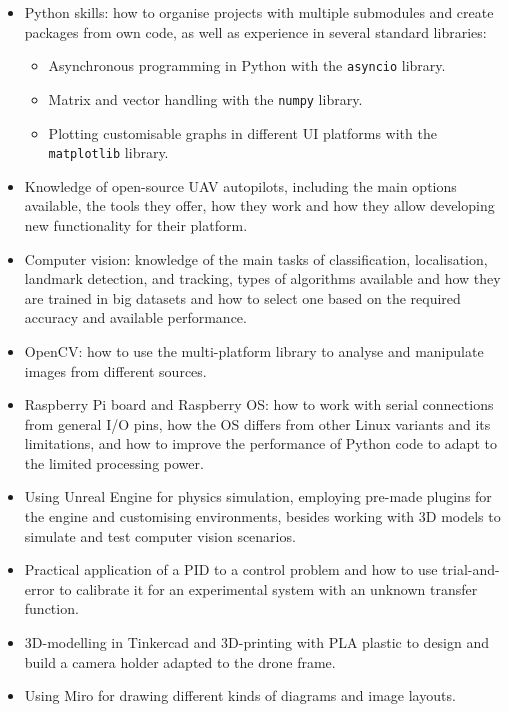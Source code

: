 \begin{itemize}
    \item Python skills: how to organise projects with multiple submodules and create packages from own code, as well as experience in several standard libraries:
    \begin{itemize}
        \item Asynchronous programming in Python with the \texttt{asyncio} library.
        \item Matrix and vector handling with the \texttt{numpy} library.
        \item Plotting customisable graphs in different UI platforms with the \texttt{matplotlib} library.
    \end{itemize}

    \item Knowledge of open-source UAV autopilots, including the main options available, the tools they offer, how they work and how they allow developing new functionality for their platform.

    \item Computer vision: knowledge of the main tasks of classification, localisation, landmark detection, and tracking, types of algorithms available and how they are trained in big datasets and how to select one based on the required accuracy and available performance.

    \item OpenCV: how to use the multi-platform library to analyse and manipulate images from different sources.

    \item Raspberry Pi board and Raspberry OS: how to work with serial connections from general I/O pins, how the OS differs from other Linux variants and its limitations, and how to improve the performance of Python code to adapt to the limited processing power.

    \item Using Unreal Engine for physics simulation, employing pre-made plugins for the engine and customising environments, besides working with 3D models to simulate and test computer vision scenarios.

    \item Practical application of a PID to a control problem and how to use trial-and-error to calibrate it for an experimental system with an unknown transfer function.

    \item 3D-modelling in Tinkercad and 3D-printing with PLA plastic to design and build a camera holder adapted to the drone frame.

    \item Using Miro for drawing different kinds of diagrams and image layouts.
\end{itemize}


